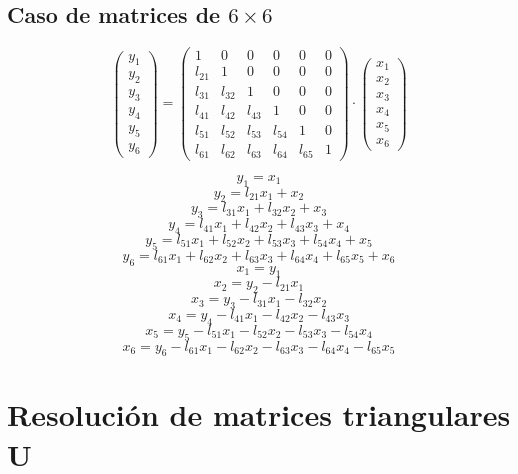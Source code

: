\documentclass[10pt,a4paper,dvipdfmx]{article}
\begin{document}
\subsection{Caso de matrices de $6\times 6$ }
$$ \left( 
\begin{array}{c}
y_{1} \\
y_{2} \\
y_{3} \\
y_{4} \\
y_{5} \\
y_{6} 
 \end{array}
\right)
 = \left( 
\begin{array}{cccccc}
1 & 0 & 0 & 0 & 0 & 0 \\
l_{{2}{1}} & 1 & 0 & 0 & 0 & 0 \\
l_{{3}{1}} & l_{{3}{2}} & 1 & 0 & 0 & 0 \\
l_{{4}{1}} & l_{{4}{2}} & l_{{4}{3}} & 1 & 0 & 0 \\
l_{{5}{1}} & l_{{5}{2}} & l_{{5}{3}} & l_{{5}{4}} & 1 & 0 \\
l_{{6}{1}} & l_{{6}{2}} & l_{{6}{3}} & l_{{6}{4}} & l_{{6}{5}} & 1 
 \end{array}
\right)
 \cdot \left( 
\begin{array}{c}
x_{1} \\
x_{2} \\
x_{3} \\
x_{4} \\
x_{5} \\
x_{6} 
 \end{array}
\right)
 $$
\begin{multicols}{2}
$$ y_{1} = x_{1} $$
$$ y_{2} = l_{{2}{1}} x_{1} + x_{2} $$
$$ y_{3} = l_{{3}{1}} x_{1} + l_{{3}{2}} x_{2} + x_{3} $$
$$ y_{4} = l_{{4}{1}} x_{1} + l_{{4}{2}} x_{2} + l_{{4}{3}} x_{3} + x_{4} $$
$$ y_{5} = l_{{5}{1}} x_{1} + l_{{5}{2}} x_{2} + l_{{5}{3}} x_{3} + l_{{5}{4}} x_{4} + x_{5} $$
$$ y_{6} = l_{{6}{1}} x_{1} + l_{{6}{2}} x_{2} + l_{{6}{3}} x_{3} + l_{{6}{4}} x_{4} + l_{{6}{5}} x_{5} + x_{6} $$
\vfill\null
\columnbreak
$$ x_{1} = y_{1} $$
$$ x_{2} = y_{2}- l_{{2}{1}} x_{1} $$
$$ x_{3} = y_{3}- l_{{3}{1}} x_{1}- l_{{3}{2}} x_{2} $$
$$ x_{4} = y_{4}- l_{{4}{1}} x_{1}- l_{{4}{2}} x_{2}- l_{{4}{3}} x_{3} $$
$$ x_{5} = y_{5}- l_{{5}{1}} x_{1}- l_{{5}{2}} x_{2}- l_{{5}{3}} x_{3}- l_{{5}{4}} x_{4} $$
$$ x_{6} = y_{6}- l_{{6}{1}} x_{1}- l_{{6}{2}} x_{2}- l_{{6}{3}} x_{3}- l_{{6}{4}} x_{4}- l_{{6}{5}} x_{5} $$
\end{multicols}
\section{Resoluci\'on de matrices triangulares U}
\end{document}
